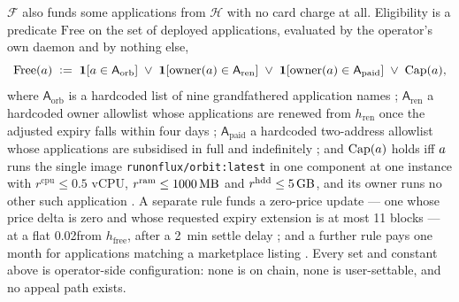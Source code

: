 \begin{definition}
\label{def:freehosting}
$\mathcal{F}$ also funds some applications from $\mathcal{H}$ with no card charge at all. Eligibility
is a predicate $\mathrm{Free}$ on the set of deployed applications, evaluated by the operator's own
daemon and by nothing else,
\[
\mathrm{Free}(a) \;\vcentcolon=\;
\mathbf{1}\!\left[a \in \mathsf{A}_{\mathrm{orb}}\right] \;\vee\;
\mathbf{1}\!\left[\mathrm{owner}(a) \in \mathsf{A}_{\mathrm{ren}}\right] \;\vee\;
\mathbf{1}\!\left[\mathrm{owner}(a) \in \mathsf{A}_{\mathrm{paid}}\right] \;\vee\;
\mathrm{Cap}(a),
\]
where $\mathsf{A}_{\mathrm{orb}}$ is a hardcoded list of nine grandfathered application names
; $\mathsf{A}_{\mathrm{ren}}$ a hardcoded
owner allowlist whose applications are renewed from $h_{\mathrm{ren}}$ once the adjusted expiry
falls within four days 
; $\mathsf{A}_{\mathrm{paid}}$ a
hardcoded two-address allowlist whose applications are subsidised in full and indefinitely
; and $\mathrm{Cap}(a)$
holds iff $a$ runs the single image \texttt{runonflux/\allowbreak{}orbit:latest} in one component at one
instance with $r^{\mathrm{cpu}} \le 0.5$ vCPU, $r^{\mathrm{ram}} \le \qty{1000}{\mega\byte}$ and
$r^{\mathrm{hdd}} \le \qty{5}{\giga\byte}$, and its owner runs no other such application
. A separate rule funds a
zero-price update --- one whose price delta is zero and whose requested expiry extension is at most
11 blocks --- at a flat \num{0.02}\flux from $h_{\mathrm{free}}$, after a \qty{2}{\minute} settle
delay 
; and a further rule pays one month for
applications matching a marketplace listing
. Every set and
constant above is operator-side configuration: none is on chain, none is user-settable, and no
appeal path exists.
\end{definition}

